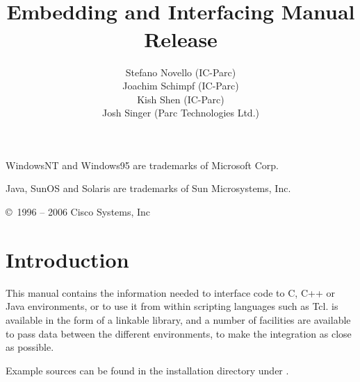 \documentclass[11pt,a4paper]{book}
\title{
    {\Large\bf \eclipse}\\
    \vspace{1cm}
    {\Huge\bf Embedding and Interfacing Manual}\\
    \vspace{1cm}
    Release \eclipseversion}
\author{
Stefano Novello (IC-Parc) \\
Joachim Schimpf (IC-Parc) \\
Kish Shen       (IC-Parc) \\
Josh Singer	(Parc Technologies Ltd.)
}
\begin{document}
\maketitle


\setcounter{page}{2}
\pagestyle{empty}

\vfill
{}

\bigskip\bigskip
WindowsNT and Windows95 are trademarks of Microsoft Corp.

Java, SunOS and Solaris are trademarks of Sun Microsystems, Inc.

\copyright\ 1996 -- 2006 Cisco Systems, Inc
\bigskip\bigskip\bigskip\bigskip\bigskip\bigskip

\cleardoublepage
\pagestyle{plain}

\tableofcontents

\cleardoublepage
{}

\chapter{Introduction}
This manual contains the information needed to interface {\eclipse}
code to C, C++ or Java environments, or to use it from within scripting
languages such as Tcl.
{\eclipse} is available in the form of a linkable library,
and a number of facilities are available to pass data between the
different environments, to make the integration as close as possible.

Example sources can be found in the {\eclipse} installation directory
under .










\appendix





\newpage
%
\printindex
%
%
\end{document}
